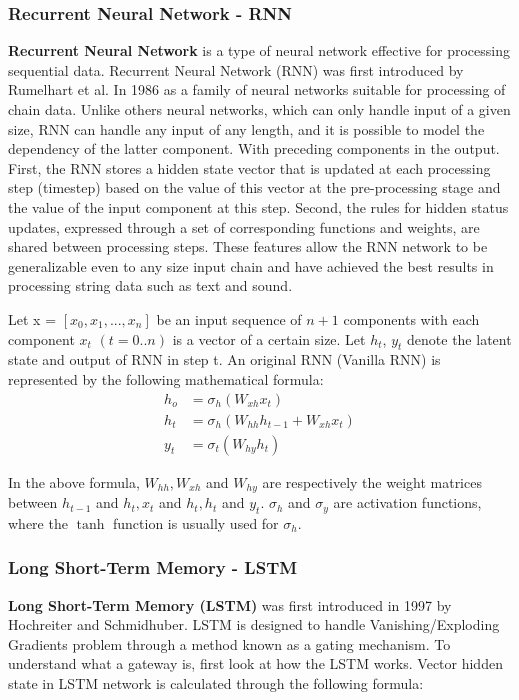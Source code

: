\subsubsection{Recurrent Neural Network - RNN}
\textbf{Recurrent Neural Network} is a type of neural network effective for processing sequential data. Recurrent Neural Network (RNN) was first introduced by Rumelhart et al. In 1986 \cite{Rumelhart:1986:PDP:104279} as a family of neural networks suitable for processing of chain data. Unlike others neural networks, which can only handle input of a given size, RNN can handle any input of any length, and it is possible to model the dependency of the latter component. With preceding components in the output. First, the RNN stores a hidden state vector that is updated at each processing step (timestep) based on the value of this vector at the pre-processing stage and the value of the input component at this step. Second, the rules for hidden status updates, expressed through a set of corresponding functions and weights, are shared between processing steps. These features allow the RNN network to be generalizable even to any size input chain and have achieved the best results in processing string data such as text and sound.

Let x = $[x_{0}, x_{1}, ..., x_{n}]$ be an input sequence of $n + 1$ components with each component $x_{t}$ $(t = 0..n)$ is a vector of a certain size. Let $h_{t}$, $y_{t}$ denote the latent state and output of RNN in step t. An original RNN (Vanilla RNN) is represented by the following mathematical formula:
\begin{align}
h_{o} &= \sigma_{h}(W_{xh}x_{t})\\
h_{t} &= \sigma_{h}(W_{hh}h_{t-1} + W_{xh}x_{t})\\
y_{t} &= \sigma_{t}(W_{hy}h_{t})
\end{align}

In the above formula, $W_{hh}, W_{xh}$ and $W_{hy}$ are respectively the weight matrices between $h_{t-1}$ and $h_{t}, x_{t}$ and $h_{t}, h_{t}$ and $y_{t}$. $\sigma_{h}$ and $\sigma_{y}$ are activation functions, where the $\tanh$ function is usually used for $\sigma_{h}$.
\subsubsection{Long Short-Term Memory - LSTM}

\textbf{Long Short-Term Memory (LSTM)} was first introduced in 1997 by Hochreiter and Schmidhuber. LSTM is designed to handle Vanishing/Exploding Gradients problem through a method known as a gating mechanism. To understand what a gateway is, first look at how the LSTM works. Vector hidden state in LSTM network is calculated through the following formula:

